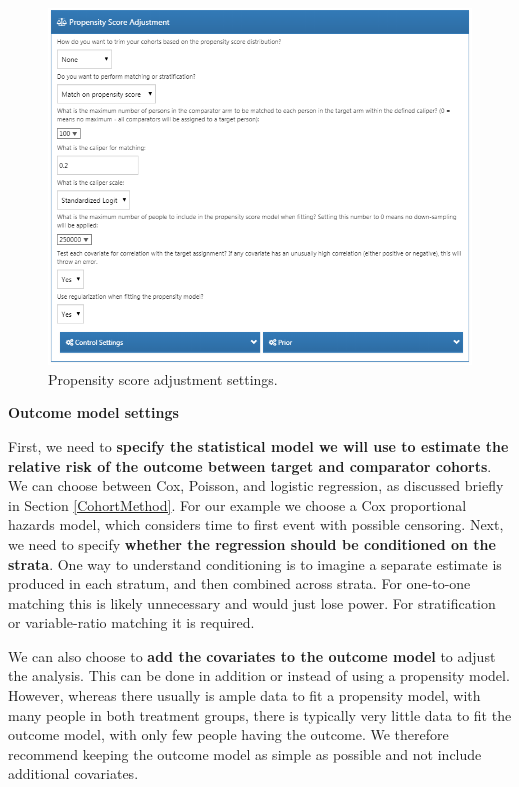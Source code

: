 \documentclass[11pt]{book}
\theoremstyle{definition}
\theoremstyle{definition}
\theoremstyle{definition}
\theoremstyle{remark}
\begin{document}
\begin{figure}

{\centering \includegraphics[width=1\linewidth]{images/PopulationLevelEstimation/psSettings} 

}

\caption{Propensity score adjustment settings.}\label{fig:psSettings}
\end{figure}

\textbf{Outcome model settings}

First, we need to \textbf{specify the statistical model we will use to estimate the relative risk of the outcome between target and comparator cohorts}. We can choose between Cox, Poisson, and logistic regression, as discussed briefly in Section \ref{CohortMethod}. For our example we choose a Cox proportional hazards model, which considers time to first event with possible censoring. Next, we need to specify \textbf{whether the regression should be conditioned on the strata}. One way to understand conditioning is to imagine a separate estimate is produced in each stratum, and then combined across strata. For one-to-one matching this is likely unnecessary and would just lose power. For stratification or variable-ratio matching it is required.  

We can also choose to \textbf{add the covariates to the outcome model} to adjust the analysis. This can be done in addition or instead of using a propensity model. However, whereas there usually is ample data to fit a propensity model, with many people in both treatment groups, there is typically very little data to fit the outcome model, with only few people having the outcome. We therefore recommend keeping the outcome model as simple as possible and not include additional covariates.
\end{document}
